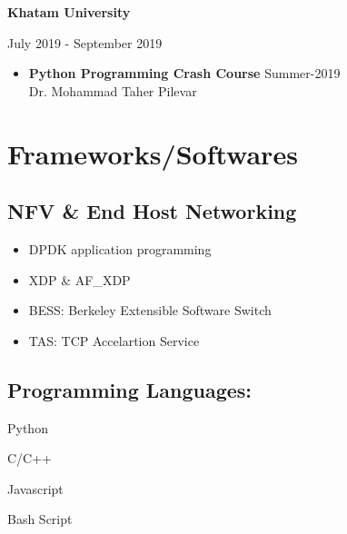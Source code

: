 \documentclass[11pt]{article}
\begin{document}
{
\renewcommand\labelitemi{}
\noindent \textbf{Khatam University} \par
July 2019 - September 2019
\begin{itemize}
    \item {\textbf{Python Programming Crash Course}  \null\hfill Summer-2019 \\
        Dr. Mohammad Taher Pilevar}
\end{itemize}
}


\section{Frameworks/Softwares}
\subsection{NFV \& End Host Networking}
\begin{itemize}
    \item DPDK application programming
    \item XDP \& AF\_XDP
    \item BESS: Berkeley Extensible Software Switch
    \item TAS: TCP Accelartion Service
\end{itemize}



\subsection{Programming Languages:}
\begin{itemize}
    \setlength\itemsep{0em}
    \begin{multicols}{2}
        \item {Python}
        \item {C/C++}
        \item {Javascript}
        \item {Bash Script}
    \end{multicols}
\end{itemize}
\end{document}
